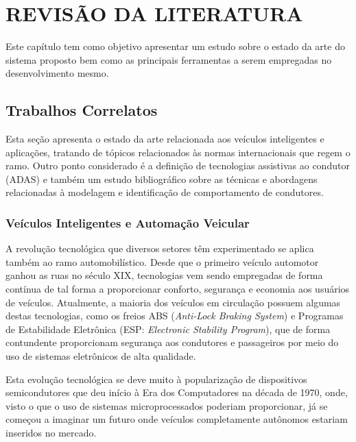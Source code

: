 \chapter{REVISÃO DA LITERATURA}
\label{cap:revisao}

Este capítulo tem como objetivo apresentar um estudo sobre o estado da arte do sistema proposto bem como as principais ferramentas a serem empregadas no desenvolvimento mesmo.

\section{Trabalhos Correlatos}

Esta seção apresenta o estado da arte relacionada aos veículos inteligentes e aplicações, tratando de tópicos relacionados às normas internacionais que regem o ramo. Outro ponto considerado é a definição de tecnologias assistivas ao condutor (ADAS) e também um estudo bibliográfico sobre as técnicas e abordagens relacionadas à modelagem e identificação de comportamento de condutores. 

\subsection{Veículos Inteligentes e Automação Veicular}

A revolução tecnológica que diversos setores têm experimentado se aplica também ao ramo automobilístico. Desde que o primeiro veículo automotor ganhou as ruas no século XIX, tecnologias vem sendo empregadas de forma contínua de tal forma a proporcionar conforto, segurança e economia aos usuários de veículos. Atualmente, a maioria dos veículos em circulação possuem algumas destas tecnologias, como os freios ABS (\textit{Anti-Lock Braking System}) e Programas de Estabilidade Eletrônica (ESP: \textit{Electronic Stability Program}), que de forma contundente proporcionam segurança aos condutores e passageiros por meio do uso de sistemas eletrônicos de alta qualidade.

Esta evolução tecnológica se deve muito à popularização de dispositivos semicondutores que deu início à Era dos Computadores na década de 1970, onde, visto o que o uso de sistemas microprocessados poderiam proporcionar, já se começou a imaginar um futuro onde veículos completamente autônomos estariam inseridos no mercado. 



